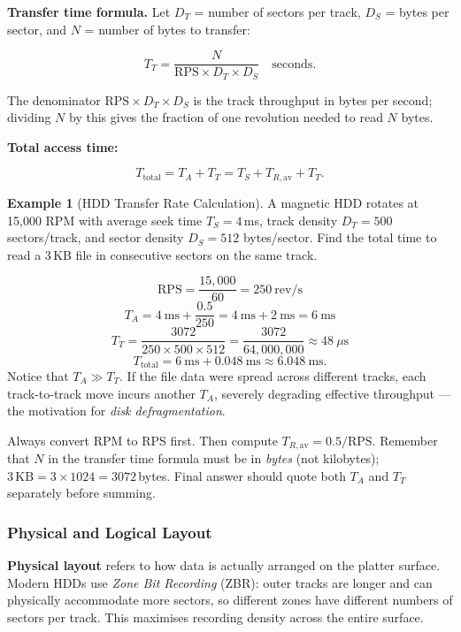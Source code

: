 \documentclass[11pt, a4paper, notitlepage]{report}
\theoremstyle{definition}
\theoremstyle{remark}
\theoremstyle{definition}
\newtheorem{example}[theorem]{Example}
\begin{document}
\textbf{Transfer time formula.} Let $D_T$ = number of sectors per track, $D_S$ = bytes per sector, and $N$ = number of bytes to transfer:

\[
  T_T = \frac{N}{\text{RPS} \times D_T \times D_S} \quad \text{seconds}.
\]

The denominator $\text{RPS} \times D_T \times D_S$ is the track throughput in bytes per second; dividing $N$ by this gives the fraction of one revolution needed to read $N$ bytes.

\textbf{Total access time:}

\[
  T_{\text{total}} = T_A + T_T = T_S + T_{R,\text{av}} + T_T.
\]

\begin{example}[HDD Transfer Rate Calculation]
  \label{ex:hdd}
  A magnetic HDD rotates at 15{,}000 RPM with average seek time $T_S = 4$\,ms, track density $D_T = 500$ sectors/track, and sector density $D_S = 512$ bytes/sector. Find the total time to read a 3\,KB file in consecutive sectors on the same track.

  \[
    \text{RPS} = \frac{15{,}000}{60} = 250\ \text{rev/s}
  \]
  \[
    T_A = 4\ \text{ms} + \frac{0.5}{250} = 4\ \text{ms} + 2\ \text{ms} = 6\ \text{ms}
  \]
  \[
    T_T = \frac{3072}{250 \times 500 \times 512} = \frac{3072}{64{,}000{,}000} \approx 48\ \mu\text{s}
  \]
  \[
    T_{\text{total}} = 6\ \text{ms} + 0.048\ \text{ms} \approx 6.048\ \text{ms}.
  \]
  Notice that $T_A \gg T_T$. If the file data were spread across different tracks, each track-to-track move incurs another $T_A$, severely degrading effective throughput — the motivation for \emph{disk defragmentation}.
\end{example}

\begin{examtip}[title={Exam Tip: HDD Timing Calculation Steps}]
  Always convert RPM to RPS first. Then compute $T_{R,\text{av}} = 0.5/\text{RPS}$. Remember that $N$ in the transfer time formula must be in \emph{bytes} (not kilobytes); $3\,\text{KB} = 3 \times 1024 = 3072$\,bytes. Final answer should quote both $T_A$ and $T_T$ separately before summing.
\end{examtip}

\subsubsection{Physical and Logical Layout}
\label{sec:hdd-layout}

\textbf{Physical layout} refers to how data is actually arranged on the platter surface. Modern HDDs use \emph{Zone Bit Recording} (ZBR): outer tracks are longer and can physically accommodate more sectors, so different zones have different numbers of sectors per track. This maximises recording density across the entire surface.
\end{document}
